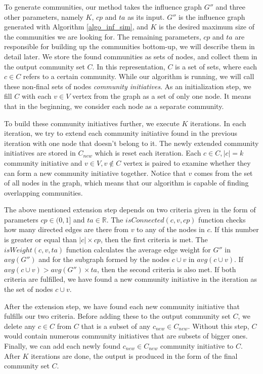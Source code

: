\documentclass[pdflatex,sn-mathphys-num]{sn-jnl}
\begin{document}
To generate communities, our method takes the influence graph $G''$ and three other parameters, namely $K$, $cp$ and $ta$ as its input. $G''$ is the influence graph generated with Algorithm \ref{algo_inf_sim}, and $K$ is the desired maximum size of the communities we are looking for. The remaining parameters, $cp$ and $ta$ are responsible for building up the communities bottom-up, we will describe them in detail later.
We store the found communities as sets of nodes, and collect them in the output community set $C$. In this representation, $C$ is a set of sets, where each $c \in C$ refers to a certain community. While our algorithm is running, we will call these non-final sets of nodes \textit{community initiatives}. As an initialization step, we fill $C$ with each $v \in V$ vertex from the graph as a set of only one node. It means that in the beginning, we consider each node as a separate community.

To build these community initiatives further, we execute $K$ iterations. In each iteration, we try to extend each community initiative found in the previous iteration with one node that doesn't belong to it. The newly extended community initiatives are stored in $C_{new}$ which is reset each iteration. Each $c \in C, |c|=k$ community initiative and $v \in V, v \notin C$ vertex is paired to examine whether they can form a new community initiative together. Notice that $v$ comes from the set of all nodes in the graph, which means that our algorithm is capable of finding overlapping communities.

The above mentioned extension step depends on two criteria given in the form of parameters $cp \in (0,1]$ and $ta \in \mathbb{R}$. The $isConnected(c,v,cp)$ function checks how many directed edges are there from $v$ to any of the nodes in $c$. If this number is greater or equal than $|c| \times cp$, then the first criteria is met. The $isWeight(c,v,ta)$ function calculates the average edge weight for $G''$ in $avg(G'')$ and for the subgraph formed by the nodes $c \cup v$ in $avg(c \cup v)$. If $avg(c \cup v) > avg(G'') \times ta$, then the second criteria is also met. If both criteria are fulfilled, we have found a new community initiative in the iteration as the set of nodes $c \cup v$.

After the extension step, we have found each new community initiative that fulfills our two criteria. Before adding these to the output community set $C$, we delete any $c \in C$ from $C$ that is a subset of any $c_{new} \in C_{new}$. Without this step, $C$ would contain numerous community initiatives that are subsets of bigger ones. Finally, we can add each newly found $c_{new} \in C_{new}$ community initiative to $C$. After $K$ iterations are done, the output is produced in the form of the final community set $C$.
\end{document}
